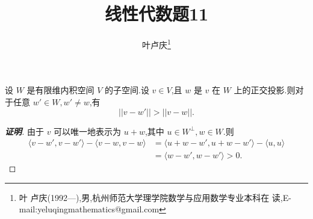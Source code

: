 ﻿\documentclass[a4paper]{article}
\begin{document}
\title{\huge{\bf{线性代数题11}}} \author{\small{叶卢庆\footnote{叶
      卢庆(1992---),男,杭州师范大学理学院数学与应用数学专业本科在
      读,E-mail:yeluqingmathematics@gmail.com}}}
\maketitle\ni
\begin{exercise}
设  $W$ 是有限维内积空间 $V$ 的子空间.设 $v\in V$,且 $w$ 是 $v$ 在 $W$
上的正交投影.则对于任意 $w'\in W,w'\neq w$,有
$$
||v-w'||>||v-w||.
$$
\end{exercise}
\begin{proof}[\textbf{证明}]
由于 $v$ 可以唯一地表示为 $u+w$,其中 $u\in W^{\bot},w\in W$.则
\begin{align*}
\langle v-w',v-w'\rangle-\langle v-w,v-w\rangle&=\langle
u+w-w',u+w-w'\rangle-\langle u,u\rangle\\&=\langle w-w',w-w'\rangle>0.
\end{align*}
\end{proof}
\end{document}
